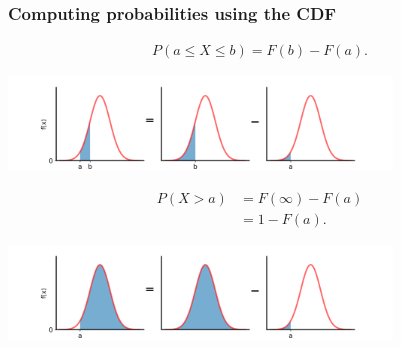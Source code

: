 \documentclass{beamer}
\begin{document}
\begin{frame}
\frametitle{Computing probabilities using the CDF}



\vspace{-.9cm}

\begin{align*}
P(a \leq X \leq b) = F(b) - F(a).
\end{align*} 


\vspace{-.8cm}

\center \includegraphics[height=2.5cm]{images/normal_ab_a_b.png}

\vspace{-.5cm}


\begin{align*}
P(X > a) &= F(\infty) - F(a)\\
&= 1 - F(a).
\end{align*} 

\vspace{-.8cm}

\center \includegraphics[height=2.5cm]{images/normal_a_inf.png}


%

\end{frame}
\end{document}
